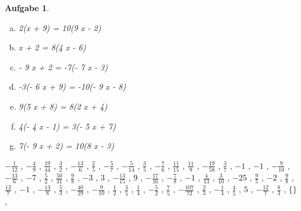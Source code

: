 \documentclass[12pt]{article}
\theoremstyle{aufg}
\newtheorem{aufgabe}{Aufgabe}
\theoremstyle{bsp}
\begin{document}
\begin{flushleft}
\begin{aufgabe}
\begin{multicols}{2}
\begin{enumerate}[a)]
5(2 x - 2) = -10(6 x + 6)
\item 
2(x + 9) = 10(9 x - 2)
\item 
x + 2 = 8(4 x - 6)
\item 
- 9 x + 2 = -7(- 7 x - 3)
\item 
-3(- 6 x + 9) = -10(- 9 x - 8)
\item 
9(5 x + 8) = 8(2 x + 4)
\item 
4(- 4 x - 1) = 3(- 5 x + 7)
\item 
7(- 9 x + 2) = 10(8 x - 3)
\end{enumerate} 
\end{multicols} 
\end{aufgabe} 
$ \scriptstyle- \frac{1}{12}$ , $ \scriptstyle- \frac{4}{9}$ , $ \scriptstyle\frac{19}{44}$ , $ \scriptstyle\frac{3}{2}$ , $ \scriptstyle- \frac{13}{6}$ , $ \scriptstyle\frac{2}{5}$ , $ \scriptstyle- \frac{5}{7}$ , $ \scriptstyle- \frac{5}{14}$ , $ \scriptstyle\frac{3}{5}$ , $ \scriptstyle- \frac{7}{6}$ , $ \scriptstyle\frac{11}{15}$ , $ \scriptstyle\frac{11}{9}$ , $ \scriptstyle- \frac{19}{58}$ , $ \scriptstyle\frac{3}{7}$ , $ \scriptstyle-1$ , $ \scriptstyle-1$ , $ \scriptstyle- \frac{9}{10}$ , $ \scriptstyle- \frac{13}{6}$ , $ \scriptstyle-7$ , $ \scriptstyle\frac{5}{2}$ , $ \scriptstyle\frac{50}{31}$ , $ \scriptstyle\frac{9}{8}$ , $ \scriptstyle-3$ , $ \scriptstyle3$ , $ \scriptstyle- \frac{13}{15}$ , $ \scriptstyle9$ , $ \scriptstyle- \frac{17}{16}$ , $ \scriptstyle- \frac{7}{8}$ , $ \scriptstyle-1$ , $ \scriptstyle\frac{4}{13}$ , $ \scriptstyle\frac{3}{10}$ , $ \scriptstyle-25$ , $ \scriptstyle\frac{9}{5}$ , $ \scriptstyle-2$ , $ \scriptstyle\frac{9}{8}$ , $ \scriptstyle\frac{12}{7}$ , $ \scriptstyle-1$ , $ \scriptstyle- \frac{13}{8}$ , $ \scriptstyle\frac{5}{3}$ , $ \scriptstyle- \frac{40}{29}$ , $ \scriptstyle- \frac{9}{10}$ , $ \scriptstyle\frac{1}{2}$ , $ \scriptstyle\frac{3}{5}$ , $ \scriptstyle\frac{1}{4}$ , $ \scriptstyle- \frac{5}{2}$ , $ \scriptstyle\frac{7}{5}$ , $ \scriptstyle- \frac{107}{72}$ , $ \scriptstyle\frac{2}{3}$ , $ \scriptstyle- \frac{1}{4}$ , $ \scriptstyle\frac{4}{5}$ , $ \scriptstyle5$ , $ \scriptstyle- \frac{12}{7}$ , $ \scriptstyle\frac{8}{3}$ , $ \scriptstyle\{\}$ , \\[0.2em] 

\end{flushleft}
\end{document}
